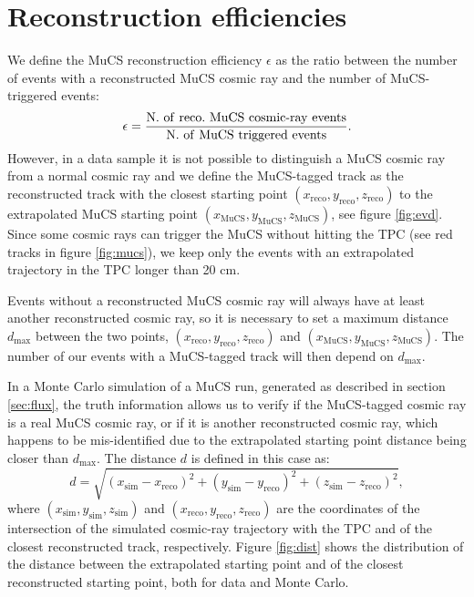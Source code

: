 \documentclass[a4paper]{scrartcl}
\def\myhyphen{{\hbox{-}}}
\begin{document}
\section{Reconstruction efficiencies}\label{sec:reco}

We define the MuCS reconstruction efficiency $\epsilon$ as the ratio between the number of events with a reconstructed MuCS cosmic ray and the number of MuCS-triggered events:
\begin{equation}\label{eq:eff}
  \epsilon = \frac{\mathrm{N.~of~reco.~MuCS~cosmic\myhyphen ray~events}}{\mathrm{N.~of~MuCS~triggered~events}}.
\end{equation}
However, in a data sample it is not possible to distinguish a MuCS cosmic ray from a normal cosmic ray and we define the MuCS-tagged track as the reconstructed track with the closest starting point $(x_{\mathrm{reco}},y_{\mathrm{reco}},z_{\mathrm{reco}})$ to the extrapolated MuCS starting point $(x_{\mathrm{MuCS}},y_{\mathrm{MuCS}},z_{\mathrm{MuCS}})$, see figure \ref{fig:evd}. Since some cosmic rays can trigger the MuCS without hitting the TPC (see red tracks in figure \ref{fig:mucs}), we keep only the events with an extrapolated trajectory in the TPC longer than 20 cm.

Events without a reconstructed MuCS cosmic ray will always have at least another reconstructed cosmic ray, so it is necessary to set a maximum distance $d_{\mathrm{max}}$ between the two points, $(x_{\mathrm{reco}},y_{\mathrm{reco}},z_{\mathrm{reco}})$ and $(x_{\mathrm{MuCS}},y_{\mathrm{MuCS}},z_{\mathrm{MuCS}})$. The number of our events with a MuCS-tagged track will then depend on $d_{\mathrm{max}}$.

In a Monte Carlo simulation of a MuCS run, generated as described in section \ref{sec:flux}, the truth information allows us to verify if the MuCS-tagged cosmic ray is a real MuCS cosmic ray, or if it is another reconstructed cosmic ray, which happens to be mis-identified due to the extrapolated starting point distance being closer than $d_{\mathrm{max}}$.
The distance $d$ is defined in this case as:
\begin{equation}\label{eq:d_mc}
d = \sqrt{(x_{\mathrm{sim}}-x_{\mathrm{reco}})^2+(y_{\mathrm{sim}}-y_{\mathrm{reco}})^2+(z_{\mathrm{sim}}-z_{\mathrm{reco}})^2},
\end{equation}
where $(x_{\mathrm{sim}},y_{\mathrm{sim}},z_{\mathrm{sim}})$ and $(x_{\mathrm{reco}},y_{\mathrm{reco}},z_{\mathrm{reco}})$ are the coordinates of the intersection of the simulated cosmic-ray trajectory with the TPC and of the closest reconstructed track, respectively. Figure \ref{fig:dist} shows the distribution of the distance between the extrapolated starting point and of the closest reconstructed starting point, both for data and Monte Carlo.
\end{document}
